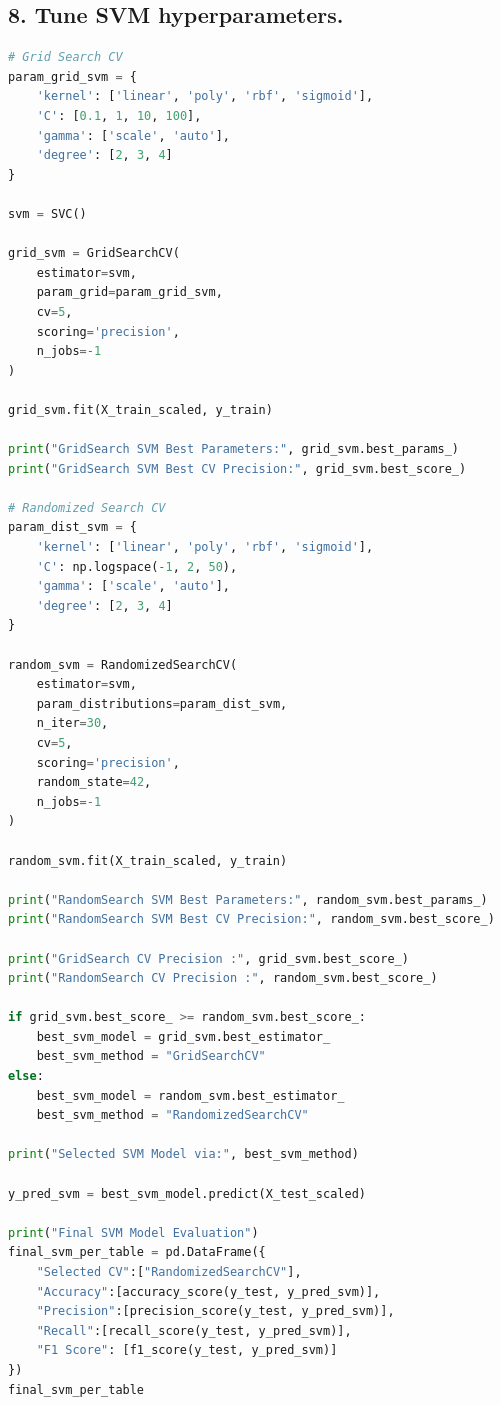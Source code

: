 \documentclass[11pt]{article}
\begin{document}
\subsection*{8. Tune SVM hyperparameters.}
\begin{lstlisting}[language=Python]
# Grid Search CV
param_grid_svm = {
    'kernel': ['linear', 'poly', 'rbf', 'sigmoid'],
    'C': [0.1, 1, 10, 100],
    'gamma': ['scale', 'auto'],
    'degree': [2, 3, 4]
}

svm = SVC()

grid_svm = GridSearchCV(
    estimator=svm,
    param_grid=param_grid_svm,
    cv=5,
    scoring='precision',
    n_jobs=-1
)

grid_svm.fit(X_train_scaled, y_train)

print("GridSearch SVM Best Parameters:", grid_svm.best_params_)
print("GridSearch SVM Best CV Precision:", grid_svm.best_score_)

# Randomized Search CV
param_dist_svm = {
    'kernel': ['linear', 'poly', 'rbf', 'sigmoid'],
    'C': np.logspace(-1, 2, 50),
    'gamma': ['scale', 'auto'],
    'degree': [2, 3, 4]
}

random_svm = RandomizedSearchCV(
    estimator=svm,
    param_distributions=param_dist_svm,
    n_iter=30,
    cv=5,
    scoring='precision',
    random_state=42,
    n_jobs=-1
)

random_svm.fit(X_train_scaled, y_train)

print("RandomSearch SVM Best Parameters:", random_svm.best_params_)
print("RandomSearch SVM Best CV Precision:", random_svm.best_score_)

print("GridSearch CV Precision :", grid_svm.best_score_)
print("RandomSearch CV Precision :", random_svm.best_score_)

if grid_svm.best_score_ >= random_svm.best_score_:
    best_svm_model = grid_svm.best_estimator_
    best_svm_method = "GridSearchCV"
else:
    best_svm_model = random_svm.best_estimator_
    best_svm_method = "RandomizedSearchCV"

print("Selected SVM Model via:", best_svm_method)

y_pred_svm = best_svm_model.predict(X_test_scaled)

print("Final SVM Model Evaluation")
final_svm_per_table = pd.DataFrame({
    "Selected CV":["RandomizedSearchCV"],
    "Accuracy":[accuracy_score(y_test, y_pred_svm)],
    "Precision":[precision_score(y_test, y_pred_svm)],
    "Recall":[recall_score(y_test, y_pred_svm)],
    "F1 Score": [f1_score(y_test, y_pred_svm)]
})
final_svm_per_table

\end{lstlisting}
\end{document}
